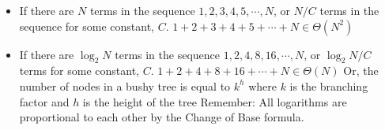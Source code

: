 \begin{itemize}
\item If there are $N$ terms in the sequence $1, 2, 3, 4, 5, \cdots, N$, or $N / C$ terms in the sequence for some constant, $C$. 
\subitem $1 + 2 + 3 + 4 + 5 + \cdots + N \in \Theta(N^2)$
\item If there are $\log_{2} N$ terms in the sequence $1, 2, 4, 8, 16, \cdots, N$, or $\log_{2} N / C$ terms for some constant, $C$.
\subitem $1 + 2 + 4 + 8 + 16 + \cdots + N \in \Theta(N)$
\subitem Or, the number of nodes in a bushy tree is equal to $k^{h}$ where $k$ is the
branching factor and $h$ is the height of the tree
\subitem Remember: All logarithms are proportional to each other by the Change of Base
formula.
\end{itemize}
